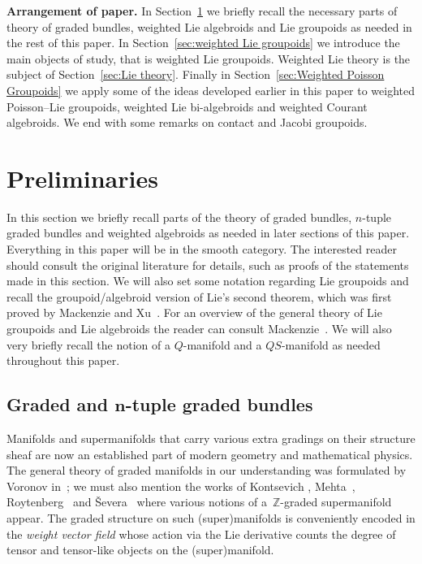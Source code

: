 \documentclass[10pt,a4paper]{amsart}
\numberwithin{equation}{section}
\begin{document}
\textbf{Arrangement of paper.} In Section~\ref{sec:Preliminaries} we brief\/ly recall the necessary parts of theory of graded bundles, weighted Lie algebroids and Lie groupoids as needed in the rest of this paper.  In Section~\ref{sec:weighted Lie groupoids} we introduce the main objects of study, that is weighted Lie groupoids. Weighted Lie theory is the subject of Section~\ref{sec:Lie theory}. Finally in Section~\ref{sec:Weighted Poisson Groupoids} we apply some of the ideas developed earlier in this paper to weighted Poisson--Lie groupoids, weighted Lie bi-algebroids and weighted Courant algebroids.  We end  with some remarks on contact and Jacobi groupoids.

\section{Preliminaries}\label{sec:Preliminaries}

In this section we brief\/ly recall parts of the theory of graded bundles, $n$-tuple graded bundles and weighted algebroids as needed in later sections of this paper. Everything in this paper will be in the smooth category.  The interested reader should consult the original literature \cite{Bruce:2014,Grabowski2013,Grabowski:2006,Grabowski2012} for details, such as proofs of the statements made in this section.  We will also set some notation regarding Lie groupoids and  recall  the groupoid/algebroid version of Lie's second theorem, which was f\/irst proved by Mackenzie and Xu~\cite{Mackenzie:2000}. For an overview of the general theory of Lie groupoids and Lie algebroids the reader can consult Mackenzie~\cite{Mackenzie2005}. We will also very brief\/ly recall the notion of a $Q$-manifold and a $QS$-manifold as needed throughout this paper.

\subsection[Graded and $n$-tuple graded bundles]{Graded and $\boldsymbol{n}$-tuple graded bundles}

Manifolds and supermanifolds that carry various extra gradings on their structure sheaf are now an established part of modern geometry and mathematical physics. The general theory of graded manifolds in our understanding was formulated  by Voronov  in~\cite{Voronov:2001qf};  we must also mention the  works of Kontsevich \cite{Kontsevich:2003}, Mehta~\cite{Mehta:2006}, Roytenberg~\cite{Roytenberg:2001} and \v{S}evera~\cite{Severa:2005} where various notions of a~$\mathbb{Z}$-graded supermanifold appear. The graded structure on such (super)manifolds is conveniently encoded in the \emph{weight vector field} whose action via the Lie derivative counts the degree of tensor and tensor-like objects on the (super)manifold.
\end{document}
